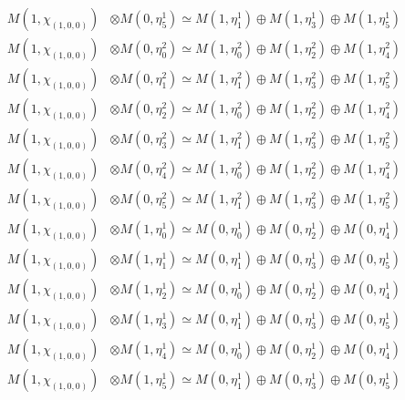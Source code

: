 \begin{align*}
M(1,\chi_{(1,0,0)}) &\otimes M(0,\eta^{1}_{5}) \simeq M(1,\eta^{1}_{1}) \oplus M(1,\eta^{1}_{3}) \oplus M(1,\eta^{1}_{5}) \\
M(1,\chi_{(1,0,0)}) &\otimes M(0,\eta^{2}_{0}) \simeq M(1,\eta^{2}_{0}) \oplus M(1,\eta^{2}_{2}) \oplus M(1,\eta^{2}_{4}) \\
M(1,\chi_{(1,0,0)}) &\otimes M(0,\eta^{2}_{1}) \simeq M(1,\eta^{2}_{1}) \oplus M(1,\eta^{2}_{3}) \oplus M(1,\eta^{2}_{5}) \\
M(1,\chi_{(1,0,0)}) &\otimes M(0,\eta^{2}_{2}) \simeq M(1,\eta^{2}_{0}) \oplus M(1,\eta^{2}_{2}) \oplus M(1,\eta^{2}_{4}) \\
M(1,\chi_{(1,0,0)}) &\otimes M(0,\eta^{2}_{3}) \simeq M(1,\eta^{2}_{1}) \oplus M(1,\eta^{2}_{3}) \oplus M(1,\eta^{2}_{5}) \\
M(1,\chi_{(1,0,0)}) &\otimes M(0,\eta^{2}_{4}) \simeq M(1,\eta^{2}_{0}) \oplus M(1,\eta^{2}_{2}) \oplus M(1,\eta^{2}_{4}) \\
M(1,\chi_{(1,0,0)}) &\otimes M(0,\eta^{2}_{5}) \simeq M(1,\eta^{2}_{1}) \oplus M(1,\eta^{2}_{3}) \oplus M(1,\eta^{2}_{5}) \\
M(1,\chi_{(1,0,0)}) &\otimes M(1,\eta^{1}_{0}) \simeq M(0,\eta^{1}_{0}) \oplus M(0,\eta^{1}_{2}) \oplus M(0,\eta^{1}_{4}) \\
M(1,\chi_{(1,0,0)}) &\otimes M(1,\eta^{1}_{1}) \simeq M(0,\eta^{1}_{1}) \oplus M(0,\eta^{1}_{3}) \oplus M(0,\eta^{1}_{5}) \\
M(1,\chi_{(1,0,0)}) &\otimes M(1,\eta^{1}_{2}) \simeq M(0,\eta^{1}_{0}) \oplus M(0,\eta^{1}_{2}) \oplus M(0,\eta^{1}_{4}) \\
M(1,\chi_{(1,0,0)}) &\otimes M(1,\eta^{1}_{3}) \simeq M(0,\eta^{1}_{1}) \oplus M(0,\eta^{1}_{3}) \oplus M(0,\eta^{1}_{5}) \\
M(1,\chi_{(1,0,0)}) &\otimes M(1,\eta^{1}_{4}) \simeq M(0,\eta^{1}_{0}) \oplus M(0,\eta^{1}_{2}) \oplus M(0,\eta^{1}_{4}) \\
M(1,\chi_{(1,0,0)}) &\otimes M(1,\eta^{1}_{5}) \simeq M(0,\eta^{1}_{1}) \oplus M(0,\eta^{1}_{3}) \oplus M(0,\eta^{1}_{5}) \\
\end{align*}

